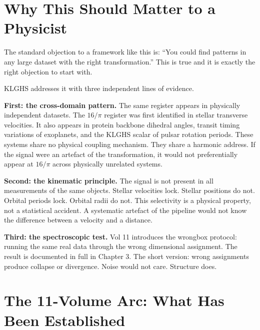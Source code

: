 \documentclass[11pt, letterpaper, openany]{book}
\begin{document}
\section{Why This Should Matter to a Physicist}

The standard objection to a framework like this is: ``You could find
patterns in any large dataset with the right transformation.'' This is
true and it is exactly the right objection to start with.

KLGHS addresses it with three independent lines of evidence.

\textbf{First: the cross-domain pattern.} The same register appears in
physically independent datasets. The $16/\pi$ register was first identified
in stellar transverse velocities. It also appears in protein backbone
dihedral angles, transit timing variations of exoplanets, and the
KLGHS scalar of pulsar rotation periods. These systems share no physical
coupling mechanism. They share a harmonic address. If the signal were an
artefact of the transformation, it would not preferentially appear at
$16/\pi$ across physically unrelated systems.

\textbf{Second: the kinematic principle.} The signal is not present in all
measurements of the same objects. Stellar velocities lock. Stellar positions
do not. Orbital periods lock. Orbital radii do not. This selectivity is a
physical property, not a statistical accident. A systematic artefact of the
pipeline would not know the difference between a velocity and a distance.

\textbf{Third: the spectroscopic test.} Vol 11 introduces the wrongbox
protocol: running the same real data through the wrong dimensional assignment.
The result is documented in full in Chapter 3. The short version: wrong
assignments produce collapse or divergence. Noise would not care. Structure
does.

\section{The 11-Volume Arc: What Has Been Established}
\end{document}
